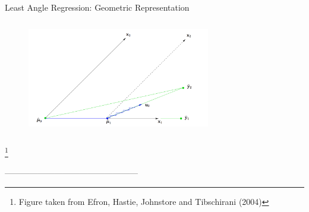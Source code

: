 \documentclass{beamer}
\begin{document}
\begin{frame}{Least Angle Regression: Geometric Representation}
\begin{figure}[h]
\centering
\includegraphics[width=8cm,height=5cm]{img/Geometric}
\end{figure}
\footnote{Figure taken from Efron, Hastie, Johnstore and Tibschirani (2004)}
\end{frame}



------------------------------------------------
\end{document}
